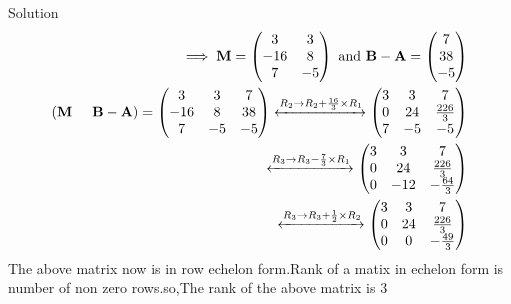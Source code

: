 \documentclass{beamer}
\numberwithin{equation}{section}
\providecommand{\brak}[1]{\ensuremath{\left(#1\right)}}
\theoremstyle{remark}
\newcommand{\myvec}[1]{\ensuremath{\begin{pmatrix}#1\end{pmatrix}}}
\let\vec\mathbf
\begin{document}
\begin{frame}{Solution}
    \begin{align}
    \implies \vec{M}=\begin{pmatrix}
    3 & 3\\
    -16 & 8\\
    7 & -5
        \end{pmatrix} \text{ and }\vec{B-A}=\myvec{7\\38\\-5}\\
         \brak{\vec{M} \hspace{0.5cm} \vec{B-A}}=\begin{pmatrix}
            3 & 3 & 7\\
            -16 & 8 & 38\\
            7 & -5 & -5
        \end{pmatrix} \xleftrightarrow{R_2 \rightarrow R_2+\frac{16}{3}\times R_1}
        \begin{pmatrix}
            3 & 3 & 7\\
            0 & 24 & \frac{226}{3}\\
            7 & -5 & -5
        \end{pmatrix}\\
        \xleftrightarrow{R_3 \rightarrow R_3-\frac{7}{3}\times R_1}\begin{pmatrix}
            3 & 3 & 7\\
            0 & 24 & \frac{226}{3}\\
            0 & -12 & -\frac{64}{3}
        \end{pmatrix}\\
        \xleftrightarrow{R_3 \rightarrow R_3+\frac{1}{2}\times R_2} \begin{pmatrix}
            3 & 3 & 7\\
            0 & 24 & \frac{226}{3}\\
            0 & 0 & -\frac{49}{3}
        \end{pmatrix}
\end{align}
The above matrix now is in row echelon form.Rank of a matix in echelon form is number of non zero rows.so,The rank of the above  matrix is 3
\end{frame}
\end{document}
